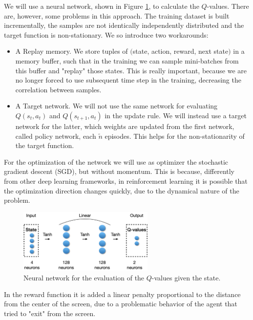 We will use a neural network, shown in Figure \ref{fig:dqnet}, to calculate the $Q$-values. There are, however, some problems in this approach. The training dataset is built incrementally, the
samples are not identically independently distributed and the target function is non-stationary. We so introduce two workarounds:
\begin{itemize}
    \item A Replay memory. We store tuples of $($state, action, reward, next state$)$ in a memory buffer, such that in the training we can sample mini-batches from this buffer and 
        "replay" those states. This is really important, because we are no longer forced to use subsequent time step in the training, decreasing the correlation between samples.
    \item A Target network. We will not use the same network for evaluating $Q(s_t, a_t)$ and $Q(s_{t+1}, a_t)$ in the update rule. We will instead use a target network for the latter,
        which weights are updated from the first network, called policy network, each $\tilde{n}$ episodes. This helps for the non-stationarity of the target function.
\end{itemize}
For the optimization of the network we will use as optimizer the stochastic gradient descent (SGD), but without momentum. This is because, differently from other deep learning frameworks, in 
reinforcement learning it is possible that the optimization direction changes quickly, due to the dynamical nature of the problem.
\begin{figure}[h]
    \centering
    \includegraphics[width=0.6\textwidth]{Images/DQNet.png}
    \caption{Neural network for the evaluation of the $Q$-values given the state.}
    \label{fig:dqnet}
\end{figure}


In the reward function it is added a linear penalty proportional to the distance from the center of the screen, due to a problematic behavior of the agent that tried to "exit" 
from the screen.

